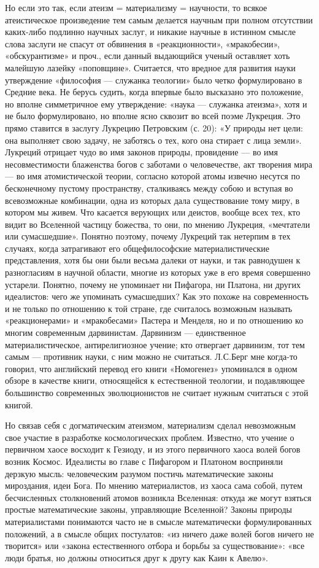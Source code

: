 Но если это так, если атеизм = материализму = научности, то всякое
атеистическое произведение тем самым делается научным при полном
отсутствии каких-либо подлинно научных заслуг, и никакие научные в
истинном смысле слова заслуги не спасут от обвинения в
«реакционности», «мракобесии», «обскурантизме» и проч., если данный
выдающийся ученый оставляет хоть малейшую лазейку «поповщине».
Считается, что вредное для развития науки утверждение «философия ---
служанка теологии» было четко формулировано в Средние века. Не берусь
судить, когда впервые было высказано это положение, но вполне
симметричное ему утверждение: «наука --- служанка атеизма», хотя и не
было формулировано, но вполне ясно сквозит во всей поэме Лукреция. Это
прямо ставится в заслугу Лукрецию Петровским (с. 20): «У природы нет
цели: она выполняет свою задачу, не заботясь о тех, кого она стирает с
лица земли». Лукреций отрицает чудо во имя законов природы, провидение
--- во имя несовместимости блаженства богов с заботами о человечестве,
акт творения мира --- во имя атомистической теории, согласно которой
атомы извечно несутся по бесконечному пустому пространству,
сталкиваясь между собою и вступая во всевозможные комбинации, одна из
которых дала существование тому миру, в котором мы живем. Что касается
верующих или деистов, вообще всех тех, кто видит во Вселенной частицу
божества, то они, по мнению Лукреция, «мечтатели или сумасшедшие».
Понятно поэтому, почему Лукреций так нетерпим в тех случаях, когда
затрагивают его общефилософские материалистические представления, хотя
бы они были весьма далеки от науки, и так равнодушен к разногласиям в
научной области, многие из которых уже в его время совершенно
устарели. Понятно, почему не упоминает ни Пифагора, ни Платона, ни
других идеалистов: чего же упоминать сумасшедших? Как это похоже на
современность и не только по отношению к той стране, где считалось
возможным называть «реакционерами» и «мракобесами» Пастера и Менделя,
но и по отношению ко многим современным дарвинистам. Дарвинизм ---
единственное материалистическое, антирелигиозное учение; кто отвергает
дарвинизм, тот тем самым --- противник науки, с ним можно не
считаться. Л.С.Берг мне когда-то говорил, что английский перевод
его книги «Номогенез» упоминался в одном обзоре в качестве книги,
относящейся к естественной теологии, и подавляющее большинство
современных эволюционистов не считает нужным считаться с этой книгой.

Но связав себя с догматическим атеизмом, материализм сделал
невозможным свое участие в разработке космологических проблем.
Известно, что учение о первичном хаосе восходит к Гезиоду, и из этого
первичного хаоса волей богов возник Космос. Идеалисты во главе с
Пифагором и Платоном восприняли дерзкую мысль: человеческим разумом
постичь математические законы мироздания, идеи Бога. По мнению
материалистов, из хаоса сама собой, путем бесчисленных столкновений
атомов возникла Вселенная: откуда же могут взяться простые
математические законы, управляющие Вселенной? Законы природы
материалистами понимаются часто не в смысле математически
формулированных положений, а в смысле общих постулатов: «из ничего
даже волей богов ничего не творится» или «закона естественного отбора
и борьбы за существование»: «все люди братья, но должны относиться
друг к другу как Каин к Авелю».

